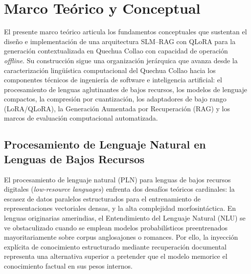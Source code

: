 \newpage
\section{Marco Teórico y Conceptual}

El presente marco teórico articula los fundamentos conceptuales que sustentan el diseño e implementación de una arquitectura SLM--RAG con QLoRA para la generación contextualizada en Quechua Collao con capacidad de operación \textit{offline}. Su construcción sigue una organización jerárquica que avanza desde la caracterización lingüística computacional del Quechua Collao hacia los componentes técnicos de ingeniería de software e inteligencia artificial: el procesamiento de lenguas aglutinantes de bajos recursos, los modelos de lenguaje compactos, la compresión por cuantización, los adaptadores de bajo rango (LoRA/QLoRA), la Generación Aumentada por Recuperación (RAG) y los marcos de evaluación computacional automatizada.

\subsection{Procesamiento de Lenguaje Natural en Lenguas de Bajos Recursos}
El procesamiento de lenguaje natural (PLN) para lenguas de bajos recursos digitales (\textit{low-resource languages}) enfrenta dos desafíos teóricos cardinales: la escasez de datos paralelos estructurados para el entrenamiento de representaciones vectoriales densas, y la alta complejidad morfosintáctica. En lenguas originarias amerindias, el Entendimiento del Lenguaje Natural (NLU) se ve obstaculizado cuando se emplean modelos probabilísticos preentrenados mayoritariamente sobre corpus anglosajones o romances. Por ello, la inyección explícita de conocimiento estructurado mediante recuperación documental representa una alternativa superior a pretender que el modelo memorice el conocimiento factual en sus pesos internos.

